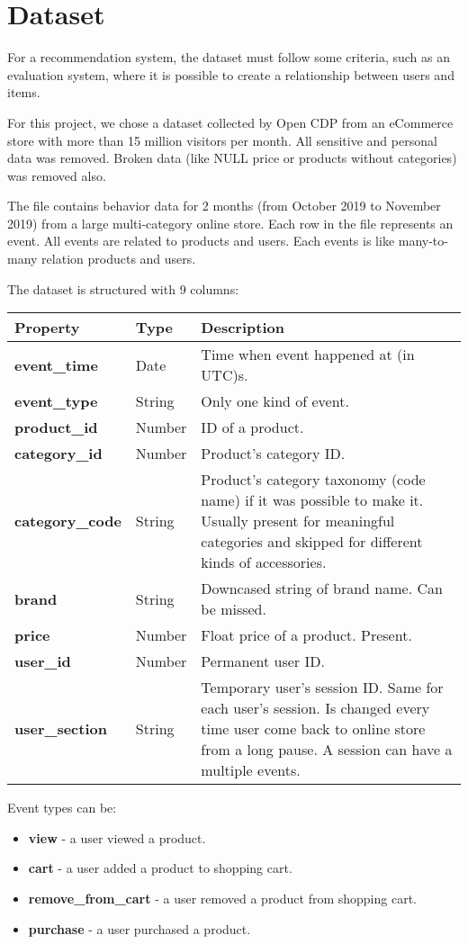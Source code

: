 \section{Dataset}
\label{dataset}

For a recommendation system, the dataset must follow some criteria, such as an evaluation system, where it is possible to create a relationship between users and items.


For this project, we chose a dataset collected by Open CDP from an eCommerce store with more than 15 million visitors per month.
All sensitive and personal data was removed. 
Broken data (like NULL price or products without categories) was removed also.

The file contains behavior data for 2 months (from October 2019 to November 2019) from a large multi-category online store.
Each row in the file represents an event. 
All events are related to products and users.
Each events is like many-to-many relation products and users.

The dataset is structured with 9 columns:
\begin{center}
\begin{tabular}{ | p{3cm} | p{2cm} | p{5cm} | } 
 \hline
 \textbf{Property} & \textbf{Type} & \textbf{Description} \\ 
 \hline
 \textbf{event\_time} & Date & Time when event happened at (in UTC)s. \\
 \hline
 \textbf{event\_type} & String & Only one kind of event. \\
 \hline
 \textbf{product\_id} & Number & ID of a product. \\
 \hline
 \textbf{category\_id} & Number & Product's category ID. \\
 \hline
 \textbf{category\_code} & String & Product's category taxonomy (code name) if it was possible to make it. Usually present for meaningful categories and skipped for different kinds of accessories. \\
 \hline
 \textbf{brand} & String & Downcased string of brand name. Can be missed. \\
 \hline
 \textbf{price} & Number & Float price of a product. Present. \\
 \hline
 \textbf{user\_id} & Number & Permanent user ID. \\
 \hline
 \textbf{user\_section} & String & Temporary user's session ID. Same for each user's session. Is changed every time user come back to online store from a long pause. A session can have a multiple events. \\
 \hline
\end{tabular}
\end{center}

Event types can be:
\begin{itemize}
    \item \textbf{view} - a user viewed a product.
    \item \textbf{cart} - a user added a product to shopping cart.
    \item \textbf{remove\_from\_cart} - a user removed a product from shopping cart.
    \item \textbf{purchase} - a user purchased a product.
\end{itemize}
